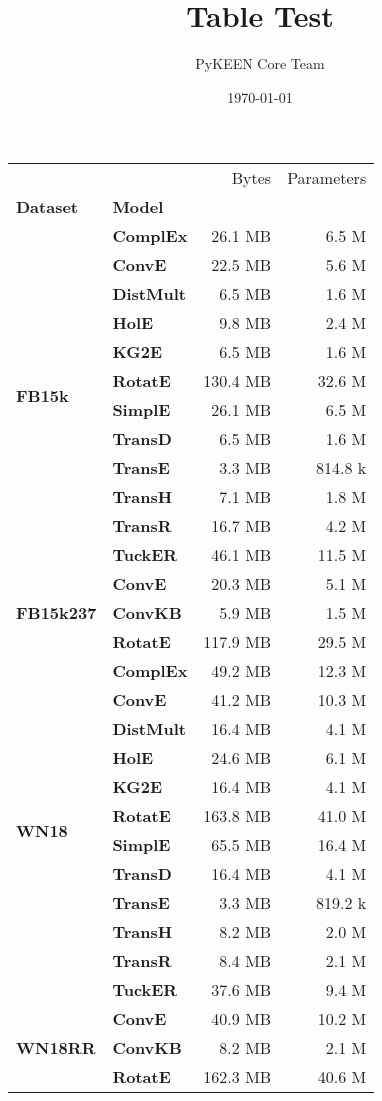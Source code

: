 \documentclass[journal]{IEEEtran}
\title{Table Test}
\author{PyKEEN Core Team}
\date{\today}
\begin{document}
\begin{tabular}{llrr}
\toprule
       &        &     Bytes & Parameters \\
\textbf{Dataset} & \textbf{Model} &           &            \\
\midrule
\multirow{12}{*}{\textbf{FB15k}} & \textbf{ComplEx} &   26.1 MB &      6.5 M \\
       & \textbf{ConvE} &   22.5 MB &      5.6 M \\
       & \textbf{DistMult} &    6.5 MB &      1.6 M \\
       & \textbf{HolE} &    9.8 MB &      2.4 M \\
       & \textbf{KG2E} &    6.5 MB &      1.6 M \\
       & \textbf{RotatE} &  130.4 MB &     32.6 M \\
       & \textbf{SimplE} &   26.1 MB &      6.5 M \\
       & \textbf{TransD} &    6.5 MB &      1.6 M \\
       & \textbf{TransE} &    3.3 MB &    814.8 k \\
       & \textbf{TransH} &    7.1 MB &      1.8 M \\
       & \textbf{TransR} &   16.7 MB &      4.2 M \\
       & \textbf{TuckER} &   46.1 MB &     11.5 M \\
\cline{1-4}
\multirow{3}{*}{\textbf{FB15k237}} & \textbf{ConvE} &   20.3 MB &      5.1 M \\
       & \textbf{ConvKB} &    5.9 MB &      1.5 M \\
       & \textbf{RotatE} &  117.9 MB &     29.5 M \\
\cline{1-4}
\multirow{12}{*}{\textbf{WN18}} & \textbf{ComplEx} &   49.2 MB &     12.3 M \\
       & \textbf{ConvE} &   41.2 MB &     10.3 M \\
       & \textbf{DistMult} &   16.4 MB &      4.1 M \\
       & \textbf{HolE} &   24.6 MB &      6.1 M \\
       & \textbf{KG2E} &   16.4 MB &      4.1 M \\
       & \textbf{RotatE} &  163.8 MB &     41.0 M \\
       & \textbf{SimplE} &   65.5 MB &     16.4 M \\
       & \textbf{TransD} &   16.4 MB &      4.1 M \\
       & \textbf{TransE} &    3.3 MB &    819.2 k \\
       & \textbf{TransH} &    8.2 MB &      2.0 M \\
       & \textbf{TransR} &    8.4 MB &      2.1 M \\
       & \textbf{TuckER} &   37.6 MB &      9.4 M \\
\cline{1-4}
\multirow{3}{*}{\textbf{WN18RR}} & \textbf{ConvE} &   40.9 MB &     10.2 M \\
       & \textbf{ConvKB} &    8.2 MB &      2.1 M \\
       & \textbf{RotatE} &  162.3 MB &     40.6 M \\
\bottomrule
\end{tabular}
\end{document}
